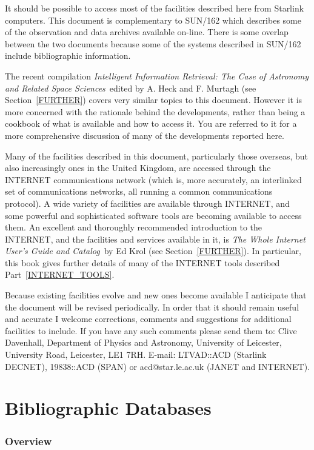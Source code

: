 \documentclass[twoside,11pt]{article}
\newcommand{\xref}[3]{#1}
\newcommand{\xlabel}[1]{}
\begin{document}
It should be possible to access most of the facilities described here
from Starlink computers. This document is complementary to
\xref{SUN/162}{sun162}{} which
describes some of the observation and data archives available on-line.
There is some overlap between the two documents because some of the
systems described in
\xref{SUN/162}{sun162}{} include bibliographic information.

The recent compilation {\it Intelligent Information Retrieval: The
Case of Astronomy and Related Space Sciences}\, edited by A. Heck and
F. Murtagh (see Section~\ref{FURTHER}) covers very similar topics to
this document. However it is more concerned with the rationale behind
the developments, rather than being a cookbook of what is available
and how to access it.  You are referred to it for a more comprehensive
discussion of many of the developments reported here.

Many of the facilities described in this document, particularly those
overseas, but also increasingly ones in the United Kingdom, are accessed
through the INTERNET communications network (which is, more accurately,
an interlinked set of communications networks, all running a common
communications protocol). A wide variety of facilities are available
through INTERNET, and some powerful and sophisticated software tools
are becoming available to access them. An excellent and thoroughly
recommended introduction to the INTERNET, and the facilities and
services available in it, is {\it The Whole Internet User's Guide and
Catalog}\, by Ed Krol (see Section~\ref{FURTHER}). In particular, this
book gives further details of many of the INTERNET tools described
Part~\ref{INTERNET_TOOLS}.

Because existing facilities evolve and new ones become available I
anticipate that the document will be revised periodically. In order that
it should remain useful and accurate I welcome corrections, comments and
suggestions for additional facilities to include. If you have any such
comments please send them to: Clive Davenhall, Department of Physics and
Astronomy, University of Leicester, University Road, Leicester, LE1 7RH.
E-mail: LTVAD::ACD (Starlink DECNET), 19838::ACD (SPAN) or
acd@star.le.ac.uk (JANET and INTERNET).


\pagebreak
\part{Bibliographic Databases}

\section{Overview\xlabel{overview}}
\end{document}
